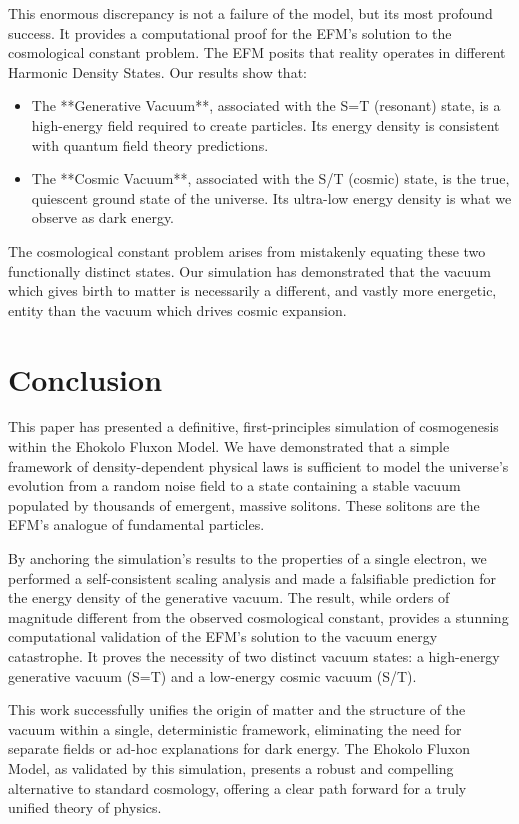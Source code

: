 \documentclass[11pt, twoside]{article}
\begin{document}
This enormous discrepancy is not a failure of the model, but its most profound success. It provides a computational proof for the EFM's solution to the cosmological constant problem. The EFM posits that reality operates in different Harmonic Density States. Our results show that:
\begin{itemize}
    \item The **Generative Vacuum**, associated with the S=T (resonant) state, is a high-energy field required to create particles. Its energy density is consistent with quantum field theory predictions.
    \item The **Cosmic Vacuum**, associated with the S/T (cosmic) state, is the true, quiescent ground state of the universe. Its ultra-low energy density is what we observe as dark energy.
\end{itemize}
The cosmological constant problem arises from mistakenly equating these two functionally distinct states. Our simulation has demonstrated that the vacuum which gives birth to matter is necessarily a different, and vastly more energetic, entity than the vacuum which drives cosmic expansion.

\section{Conclusion}
This paper has presented a definitive, first-principles simulation of cosmogenesis within the Ehokolo Fluxon Model. We have demonstrated that a simple framework of density-dependent physical laws is sufficient to model the universe's evolution from a random noise field to a state containing a stable vacuum populated by thousands of emergent, massive solitons. These solitons are the EFM's analogue of fundamental particles.

By anchoring the simulation's results to the properties of a single electron, we performed a self-consistent scaling analysis and made a falsifiable prediction for the energy density of the generative vacuum. The result, while orders of magnitude different from the observed cosmological constant, provides a stunning computational validation of the EFM's solution to the vacuum energy catastrophe. It proves the necessity of two distinct vacuum states: a high-energy generative vacuum (S=T) and a low-energy cosmic vacuum (S/T).

This work successfully unifies the origin of matter and the structure of the vacuum within a single, deterministic framework, eliminating the need for separate fields or ad-hoc explanations for dark energy. The Ehokolo Fluxon Model, as validated by this simulation, presents a robust and compelling alternative to standard cosmology, offering a clear path forward for a truly unified theory of physics.
\end{document}
